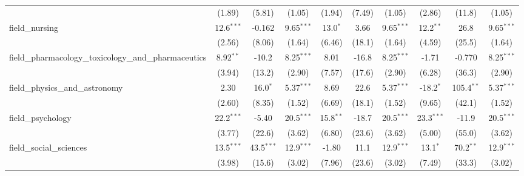 \begin{tabular}{lccccccccc}
                                                               & (1.89)        & (5.81)         & (1.05)        & (1.94)        & (7.49)         & (1.05)        & (2.86)        & (11.8)         & (1.05)\\   
   field\_nursing                                              & 12.6$^{***}$  & -0.162         & 9.65$^{***}$  & 13.0$^{*}$    & 3.66           & 9.65$^{***}$  & 12.2$^{**}$   & 26.8           & 9.65$^{***}$\\   
                                                               & (2.56)        & (8.06)         & (1.64)        & (6.46)        & (18.1)         & (1.64)        & (4.59)        & (25.5)         & (1.64)\\   
   field\_pharmacology\_toxicology\_and\_pharmaceutics         & 8.92$^{**}$   & -10.2          & 8.25$^{***}$  & 8.01          & -16.8          & 8.25$^{***}$  & -1.71         & -0.770         & 8.25$^{***}$\\   
                                                               & (3.94)        & (13.2)         & (2.90)        & (7.57)        & (17.6)         & (2.90)        & (6.28)        & (36.3)         & (2.90)\\   
   field\_physics\_and\_astronomy                              & 2.30          & 16.0$^{*}$     & 5.37$^{***}$  & 8.69          & 22.6           & 5.37$^{***}$  & -18.2$^{*}$   & 105.4$^{**}$   & 5.37$^{***}$\\   
                                                               & (2.60)        & (8.35)         & (1.52)        & (6.69)        & (18.1)         & (1.52)        & (9.65)        & (42.1)         & (1.52)\\   
   field\_psychology                                           & 22.2$^{***}$  & -5.40          & 20.5$^{***}$  & 15.8$^{**}$   & -18.7          & 20.5$^{***}$  & 23.3$^{***}$  & -11.9          & 20.5$^{***}$\\   
                                                               & (3.77)        & (22.6)         & (3.62)        & (6.80)        & (23.6)         & (3.62)        & (5.00)        & (55.0)         & (3.62)\\   
   field\_social\_sciences                                     & 13.5$^{***}$  & 43.5$^{***}$   & 12.9$^{***}$  & -1.80         & 11.1           & 12.9$^{***}$  & 13.1$^{*}$    & 70.2$^{**}$    & 12.9$^{***}$\\   
                                                               & (3.98)        & (15.6)         & (3.02)        & (7.96)        & (23.6)         & (3.02)        & (7.49)        & (33.3)         & (3.02)\\   

\end{tabular}
